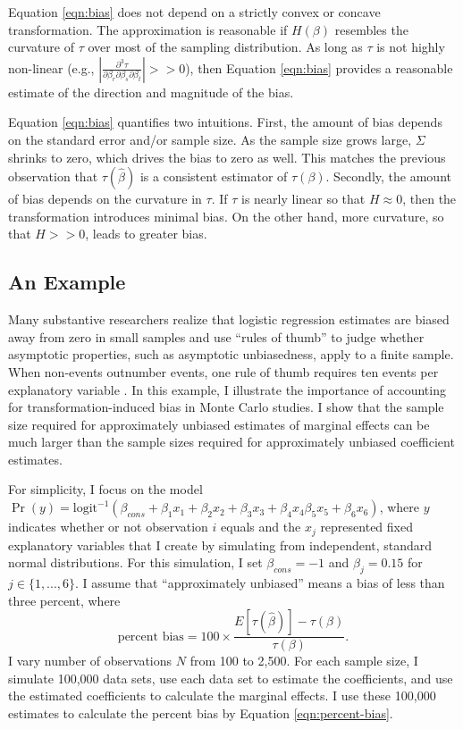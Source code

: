 \documentclass[12pt]{article}
\begin{document}
Equation \ref{eqn:bias} does not depend on a strictly convex or concave transformation. 
The approximation is reasonable if $H(\beta)$ resembles the curvature of $\tau$ over most of the sampling distribution. 
As long as $\tau$ is not highly non-linear (e.g., $\left|\frac{\partial^3 \tau}{\partial \beta_r \partial \beta_s \partial \beta_t}\right| >> 0$), then Equation \ref{eqn:bias} provides a reasonable estimate of the direction and magnitude of the bias.

Equation \ref{eqn:bias} quantifies two intuitions. 
First, the amount of bias depends on the standard error and/or sample size. 
As the sample size grows large, $\Sigma$ shrinks to zero, which drives the bias to zero as well. 
This matches the previous observation that $\tau(\hat{\beta})$ is a consistent estimator of $\tau(\beta)$. 
Secondly, the amount of bias depends on the curvature in $\tau$. 
If $\tau$ is nearly linear so that $H \approx 0$, then the transformation introduces minimal bias. 
On the other hand, more curvature, so that $H >> 0$, leads to greater bias. 

\subsection*{An Example}

Many substantive researchers realize that logistic regression estimates are biased away from zero in small samples and use ``rules of thumb'' to judge whether asymptotic properties, such as asymptotic unbiasedness, apply to a finite sample.
When non-events outnumber events, one rule of thumb requires ten events per explanatory variable \citep{Peduzzietal1996}. 
In this example, I illustrate the importance of accounting for transformation-induced bias in Monte Carlo studies. 
I show that the sample size required for approximately unbiased estimates of marginal effects can be much larger than the sample sizes required for approximately unbiased coefficient estimates.

For simplicity, I focus on the model $\Pr (y) = \text{logit}^{-1}(\beta_{cons} + \beta_1x_1 + \beta_2x_2 + \beta_3x_3 + \beta_4x_4 \beta_5x_5 + \beta_6x_6)$, where $y$ indicates whether or not observation $i$ equals and the $x_j$ represented fixed explanatory variables that I create by simulating from independent, standard normal distributions. 
For this simulation, I set $\beta_{cons} = -1$ and $\beta_j =  0.15$ for $j \in \{1, ..., 6\}$. 
I assume that ``approximately unbiased'' means a bias of less than three percent, where
\begin{equation}\label{eqn:percent-bias}
\text{percent bias} = 100 \times \frac{E[\tau(\hat{\beta})] - \tau(\beta)}{\tau(\beta)}\text{.}
\end{equation}
I vary number of observations $N$ from 100 to 2,500.
For each sample size, I simulate 100,000 data sets, use each data set to estimate the coefficients, and use the estimated coefficients to calculate the marginal effects.
I use these 100,000 estimates to calculate the percent bias by Equation \ref{eqn:percent-bias}.
\end{document}
